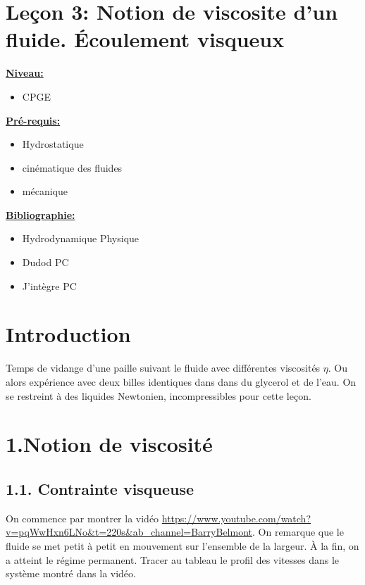 \documentclass[french, a4paper, 10pt, twocolumn, landscape]{article}
\begin{document}
\section*{Leçon 3: Notion de viscosite d'un fluide. Écoulement visqueux}

\noindent\underline{\textbf{Niveau:}}
\begin{itemize}
  \item CPGE 
\end{itemize}
\underline{\textbf{Pr{\'e}-requis: }}

\begin{itemize}  
  \item Hydrostatique
  \item cinématique des fluides
  \item mécanique
\end{itemize}
\underline{\textbf{Bibliographie:}}

\begin{itemize}  
    \item Hydrodynamique Physique
    \item Dudod PC
    \item J'intègre PC
  \end{itemize}




\section*{Introduction}

Temps de vidange d'une paille suivant le fluide avec différentes viscosités $\eta$. Ou alors expérience avec deux billes identiques dans dans du glycerol et de l'eau.
On se restreint à des liquides Newtonien, incompressibles pour cette leçon.

\section*{1.Notion de viscosité}
\subsection*{1.1. Contrainte visqueuse}

On commence par montrer la vidéo \url{https://www.youtube.com/watch?v=pqWwHxn6LNo&t=220s&ab_channel=BarryBelmont}. On remarque que le fluide se met petit à petit en mouvement sur l’ensemble de la largeur. À la fin, on a
atteint le régime permanent.
Tracer au tableau le profil des vitesses dans le système montré dans la vidéo.\medskip
\end{document}
